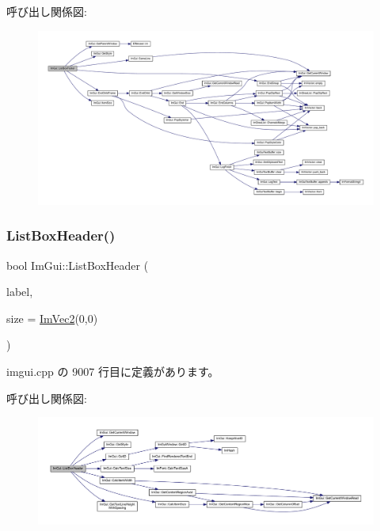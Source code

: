 呼び出し関係図\+:\nopagebreak
\begin{figure}[H]
\begin{center}
\leavevmode
\includegraphics[width=350pt]{namespace_im_gui_a9a0a8f6a4a67280dce7bd91310a83a03_cgraph}
\end{center}
\end{figure}
\mbox{\label{namespace_im_gui_a4003d6a6ab57f2fb43db80c6339a1aed}} 
\subsubsection{\texorpdfstring{List\+Box\+Header()}{ListBoxHeader()}\hspace{0.1cm}{\footnotesize\ttfamily [1/2]}}
{\footnotesize\ttfamily bool Im\+Gui\+::\+List\+Box\+Header (\begin{DoxyParamCaption}\item[{const char $\ast$}]{label,  }\item[{const \mbox{\hyperlink{struct_im_vec2}{Im\+Vec2}} \&}]{size = {\ttfamily \mbox{\hyperlink{struct_im_vec2}{Im\+Vec2}}(0,0)} }\end{DoxyParamCaption})}



 imgui.\+cpp の 9007 行目に定義があります。

呼び出し関係図\+:\nopagebreak
\begin{figure}[H]
\begin{center}
\leavevmode
\includegraphics[width=350pt]{namespace_im_gui_a4003d6a6ab57f2fb43db80c6339a1aed_cgraph}
\end{center}
\end{figure}
\mbox{\label{namespace_im_gui_a6c5c48e5e5b90365f3f6faaa3307af26}} 
